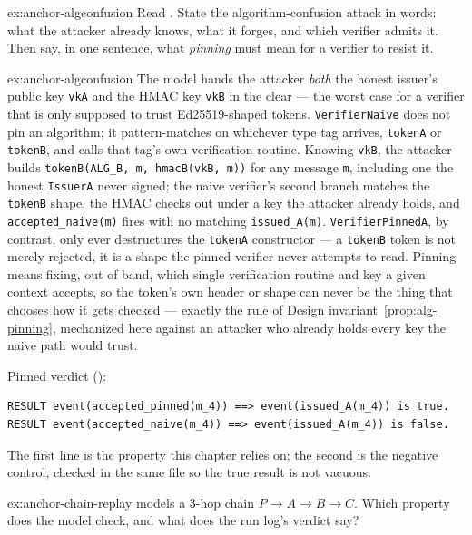 \documentclass[11pt,a4paper]{article}
\theoremstyle{definition}
\begin{document}
\begin{pdexercise}[kind=Trace,rating=2]{ex:anchor-algconfusion}
Read . State the algorithm-confusion attack in words: what the attacker already knows, what it forges, and which verifier admits it. Then say, in one sentence, what \emph{pinning} must mean for a verifier to resist it.
\end{pdexercise}
\begin{pdsolution}{ex:anchor-algconfusion}
The model hands the attacker \emph{both} the honest issuer's public key \texttt{vkA} and the HMAC key \texttt{vkB} in the clear --- the worst case for a verifier that is only supposed to trust Ed25519-shaped tokens. \texttt{VerifierNaive} does not pin an algorithm; it pattern-matches on whichever type tag arrives, \texttt{tokenA} or \texttt{tokenB}, and calls that tag's own verification routine. Knowing \texttt{vkB}, the attacker builds \texttt{tokenB(ALG\_B, m, hmacB(vkB, m))} for any message \texttt{m}, including one the honest \texttt{IssuerA} never signed; the naive verifier's second branch matches the \texttt{tokenB} shape, the HMAC checks out under a key the attacker already holds, and \texttt{accepted\_naive(m)} fires with no matching \texttt{issued\_A(m)}. \texttt{VerifierPinnedA}, by contrast, only ever destructures the \texttt{tokenA} constructor --- a \texttt{tokenB} token is not merely rejected, it is a shape the pinned verifier never attempts to read. Pinning means fixing, out of band, which single verification routine and key a given context accepts, so the token's own header or shape can never be the thing that chooses how it gets checked --- exactly the rule of Design invariant~\ref{prop:alg-pinning}, mechanized here against an attacker who already holds every key the naive path would trust.

Pinned verdict ():
\begin{lstlisting}
RESULT event(accepted_pinned(m_4)) ==> event(issued_A(m_4)) is true.
RESULT event(accepted_naive(m_4)) ==> event(issued_A(m_4)) is false.
\end{lstlisting}
The first line is the property this chapter relies on; the second is the negative control, checked in the same file so the true result is not vacuous.
\end{pdsolution}
\begin{pdexercise}[kind=Check,rating=1]{ex:anchor-chain-replay}
 models a 3-hop chain $P \to A \to B \to C$. Which property does the model check, and what does the run log's verdict say?
\end{pdexercise}
\end{document}
